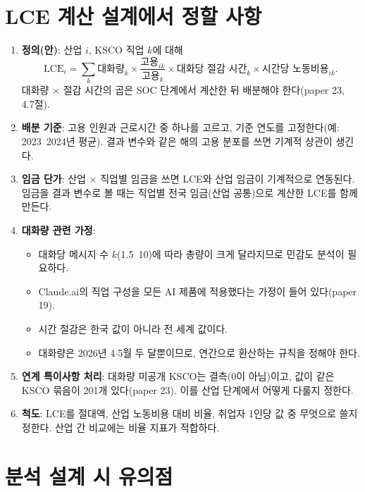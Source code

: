 \documentclass[11pt]{article}
\begin{document}
\section{LCE 계산 설계에서 정할 사항}

\begin{enumerate}[leftmargin=*]
  \item \textbf{정의(안)}: 산업 $i$, KSCO 직업 $k$에 대해
  \[
    \text{LCE}_i = \sum_k \text{대화량}_k \times \frac{\text{고용}_{ik}}{\text{고용}_k} \times \text{대화당 절감 시간}_k \times \text{시간당 노동비용}_{ik}.
  \]
  대화량 $\times$ 절감 시간의 곱은 SOC 단계에서 계산한 뒤 배분해야 한다(paper 23, 4.7절).
  \item \textbf{배분 기준}: 고용 인원과 근로시간 중 하나를 고르고, 기준 연도를 고정한다(예: 2023~2024년 평균). 결과 변수와 같은 해의 고용 분포를 쓰면 기계적 상관이 생긴다.
  \item \textbf{임금 단가}: 산업 $\times$ 직업별 임금을 쓰면 LCE와 산업 임금이 기계적으로 연동된다. 임금을 결과 변수로 볼 때는 직업별 전국 임금(산업 공통)으로 계산한 LCE를 함께 만든다.
  \item \textbf{대화량 관련 가정}:
  \begin{itemize}
    \item 대화당 메시지 수 $k$(1.5~10)에 따라 총량이 크게 달라지므로 민감도 분석이 필요하다.
    \item Claude.ai의 직업 구성을 모든 AI 제품에 적용했다는 가정이 들어 있다(paper 19).
    \item 시간 절감은 한국 값이 아니라 전 세계 값이다.
    \item 대화량은 2026년 4$\cdot$5월 두 달뿐이므로, 연간으로 환산하는 규칙을 정해야 한다.
  \end{itemize}
  \item \textbf{연계 특이사항 처리}: 대화량 미공개 KSCO는 결측(0이 아님)이고, 값이 같은 KSCO 묶음이 201개 있다(paper 23). 이를 산업 단계에서 어떻게 다룰지 정한다.
  \item \textbf{척도}: LCE를 절대액, 산업 노동비용 대비 비율, 취업자 1인당 값 중 무엇으로 쓸지 정한다. 산업 간 비교에는 비율 지표가 적합하다.
\end{enumerate}

\section{분석 설계 시 유의점}
\end{document}

